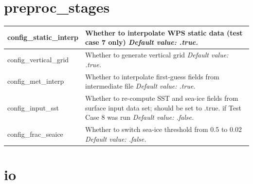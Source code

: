 \documentclass[11pt]{report}
\begin{document}
\section{preproc\_stages}

{\small
\begin{longtable}{|p{1.5in} |p{4.75in}|}
 \hline 
   config\_static\_interp   & Whether to interpolate WPS static data (test case 7 only) \newline 
   {\em Default value: .true.} \\ \hline

   config\_vertical\_grid   & Whether to generate vertical grid \newline 
   {\em Default value: .true.} \\ \hline

   config\_met\_interp      & Whether to interpolate first-guess fields from intermediate file \newline 
   {\em Default value: .true.} \\ \hline
  
 
   config\_input\_sst       & Whether to re-compute SST and sea-ice fields from surface input data set; should be set to .true. if Test Case 8 was run \newline 
   {\em Default value: .false.} \\ \hline
    
   config\_frac\_seaice       & Whether to switch sea-ice threshold from 0.5 to 0.02 \newline 
   {\em Default value: .false.} \\ \hline
\end{longtable}
}

\section{io}
\end{document}
